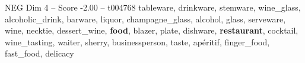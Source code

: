 \begin{textsample}{NEG Dim 4 – Score -2.00 – t004768}  \label{ex:f4_neg_034}
tableware, drinkware, stemware, wine\_glass, alcoholic\_drink, barware, liquor, champagne\_glass, alcohol, glass, serveware, wine, necktie, dessert\_wine, \textbf{food}, blazer, plate, dishware, \textbf{restaurant}, cocktail, wine\_tasting, waiter, sherry, businessperson, taste, apéritif, finger\_food, fast\_food, delicacy

\end{textsample}
